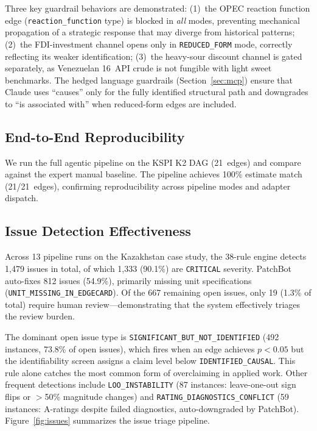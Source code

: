 \documentclass{article}
\begin{document}
Three key guardrail behaviors are demonstrated: (1)~the OPEC reaction function edge (\texttt{reaction\_function} type) is blocked in \emph{all} modes, preventing mechanical propagation of a strategic response that may diverge from historical patterns; (2)~the FDI-investment channel opens only in \texttt{REDUCED\_FORM} mode, correctly reflecting its weaker identification; (3)~the heavy-sour discount channel is gated separately, as Venezuelan 16~API crude is not fungible with light sweet benchmarks. The hedged language guardrails (Section~\ref{sec:mcp}) ensure that Claude uses ``causes'' only for the fully identified structural path and downgrades to ``is associated with'' when reduced-form edges are included.

\subsection{End-to-End Reproducibility}

We run the full agentic pipeline on the KSPI K2 DAG (21~edges) and compare against the expert manual baseline. The pipeline achieves 100\% estimate match (21/21~edges), confirming reproducibility across pipeline modes and adapter dispatch.

\subsection{Issue Detection Effectiveness}

Across 13 pipeline runs on the Kazakhstan case study, the 38-rule engine detects 1{,}479 issues in total, of which 1{,}333 (90.1\%) are \texttt{CRITICAL} severity. PatchBot auto-fixes 812 issues (54.9\%), primarily missing unit specifications (\texttt{UNIT\_MISSING\_IN\_EDGECARD}). Of the 667 remaining open issues, only 19 (1.3\% of total) require human review---demonstrating that the system effectively triages the review burden.

The dominant open issue type is \texttt{SIGNIFICANT\_BUT\_NOT\_IDENTIFIED} (492 instances, 73.8\% of open issues), which fires when an edge achieves $p < 0.05$ but the identifiability screen assigns a claim level below \texttt{IDENTIFIED\_CAUSAL}. This rule alone catches the most common form of overclaiming in applied work. Other frequent detections include \texttt{LOO\_INSTABILITY} (87 instances: leave-one-out sign flips or $>$50\% magnitude changes) and \texttt{RATING\_DIAGNOSTICS\_CONFLICT} (59 instances: A-ratings despite failed diagnostics, auto-downgraded by PatchBot). Figure~\ref{fig:issues} summarizes the issue triage pipeline.
\end{document}
